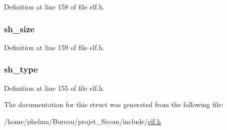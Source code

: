 Definition at line 158 of file elf.\-h.

\hypertarget{struct_elf32___shdr_a22b9e86344a0dff7e25af8e49f77b1e9}{
\subsubsection[{sh\-\_\-size}]{ sh\-\_\-size}}\label{struct_elf32___shdr_a22b9e86344a0dff7e25af8e49f77b1e9}


Definition at line 159 of file elf.\-h.

\hypertarget{struct_elf32___shdr_a2a41bb54bee9e047efbf10185972395b}{
\subsubsection[{sh\-\_\-type}]{ sh\-\_\-type}}\label{struct_elf32___shdr_a2a41bb54bee9e047efbf10185972395b}


Definition at line 155 of file elf.\-h.



The documentation for this struct was generated from the following file\-:\begin{DoxyCompactItemize}
\item 
/home/phelma/\-Bureau/projet\-\_\-\-Sicom/include/\hyperlink{elf_8h}{elf.\-h}\end{DoxyCompactItemize}
